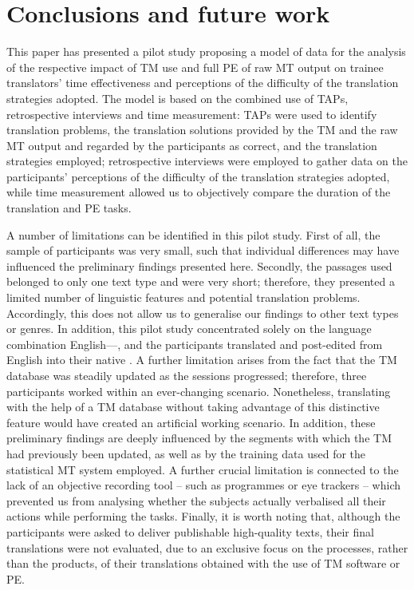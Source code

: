 \documentclass[output=paper]{LSP/langsci}
\begin{document}
\section{Conclusions and future work}\label{ressetti-gaspari:sec:8}
This paper has presented a pilot study proposing a model of data  for the analysis of the respective impact of TM use and full PE of raw MT output on trainee translators' time effectiveness and perceptions of the difficulty of the translation strategies adopted. The model is based on the combined use of TAPs, retrospective interviews and time measurement: TAPs were used to identify translation problems, the translation solutions provided by the TM and the raw MT output and regarded by the participants as correct, and the translation strategies employed; retrospective interviews were employed to gather data on the participants' perceptions of the difficulty of the translation strategies adopted, while time measurement allowed us to objectively compare the duration of the translation and PE tasks.


A number of limitations can be identified in this pilot study. First of all, the sample of participants was very small, such that individual differences may have influenced the preliminary findings presented here. Secondly, the passages used belonged to only one text type and were very short; therefore, they presented a limited number of linguistic features and potential translation problems. Accordingly, this does not allow us to generalise our findings to other text types or genres. In addition, this pilot study concentrated solely on the language combination English—, and the participants translated and post-edited from English into their native . A further limitation arises from the fact that the TM database was steadily updated as the sessions progressed; therefore, three participants worked within an ever-changing scenario. Nonetheless, translating with the help of a TM database without taking advantage of this distinctive feature would have created an artificial working scenario. In addition, these preliminary findings are deeply influenced by the segments with which the TM had previously been updated, as well as by the training data used for the statistical MT system employed. A further crucial limitation is connected to the lack of an objective recording tool -- such as  programmes or eye trackers -- which prevented us from analysing whether the subjects actually verbalised all their actions while performing the tasks. Finally, it is worth noting that, although the participants were asked to deliver publishable high-quality texts, their final  translations were not evaluated, due to an exclusive focus on the processes, rather than the products, of their translations obtained with the use of TM software or PE.
\end{document}
